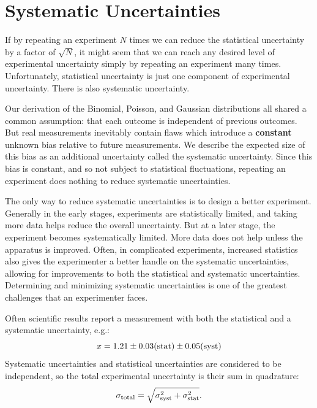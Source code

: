 \documentclass[12pt,oneside]{book}
\begin{document}
\section{Systematic Uncertainties}

If by repeating an experiment $N$ times we can reduce the statistical
uncertainty by a factor of $\sqrt{N}$, it might seem that we can reach
any desired level of experimental uncertainty simply by repeating an
experiment many times.  Unfortunately, statistical uncertainty is just
one component of experimental uncertainty.  There is also systematic
uncertainty.

Our derivation of the Binomial, Poisson, and Gaussian distributions
all shared a common assumption: that each outcome is independent of
previous outcomes.  But real measurements inevitably contain flaws
which introduce a {\bf constant} unknown bias relative to future
measurements.  We describe the expected size of this bias as an
additional uncertainty called the systematic uncertainty.  Since this
bias is constant, and so not subject to statistical fluctuations,
repeating an experiment does nothing to reduce systematic
uncertainties.

The only way to reduce systematic uncertainties is to design a better
experiment.  Generally in the early stages, experiments are
statistically limited, and taking more data helps reduce the overall
uncertainty.  But at a later stage, the experiment becomes
systematically limited.  More data does not help unless the apparatus
is improved.  Often, in complicated experiments, increased statistics
also gives the experimenter a better handle on the systematic
uncertainties, allowing for improvements to both the statistical and
systematic uncertainties.  Determining and minimizing systematic
uncertainties is one of the greatest challenges that an experimenter
faces.

Often scientific results report a measurement with both the
statistical and a systematic uncertainty, e.g.:
\begin{displaymath}
 x = 1.21 \pm 0.03 ({\rm stat}) \pm 0.05 ({\rm syst})
\end{displaymath}
Systematic uncertainties and statistical uncertainties are considered
to be independent, so the total experimental uncertainty is their sum
in quadrature:
\begin{displaymath}
\sigma_{\rm total} = \sqrt{\sigma^2_{\rm syst} + \sigma^2_{\rm stat}}.
\end{displaymath}
\end{document}
